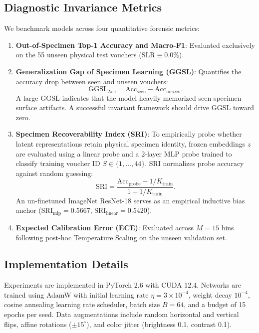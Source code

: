 \documentclass[a4paper,fleqn]{cas-sc}
\begin{document}
\subsection{Diagnostic Invariance Metrics}
We benchmark models across four quantitative forensic metrics:
\begin{enumerate}
    \item \textbf{Out-of-Specimen Top-1 Accuracy and Macro-F1}: Evaluated exclusively on the 55 unseen physical test vouchers ($\mathrm{SLR} \equiv 0.0\%$).
    
    \item \textbf{Generalization Gap of Specimen Learning (GGSL)}: Quantifies the accuracy drop between seen and unseen vouchers:
    \begin{equation}
        \text{GGSL}_{\text{Acc}} = \text{Acc}_{\text{seen}} - \text{Acc}_{\text{unseen}}.
    \end{equation}
    A large GGSL indicates that the model heavily memorized seen specimen surface artifacts. A successful invariant framework should drive GGSL toward zero.
    
    \item \textbf{Specimen Recoverability Index (SRI)}: To empirically probe whether latent representations retain physical specimen identity, frozen embeddings $z$ are evaluated using a linear probe and a 2-layer MLP probe trained to classify training voucher ID $S \in \{1,\dots,44\}$. SRI normalizes probe accuracy against random guessing:
    \begin{equation}
        \text{SRI} = \frac{\text{Acc}_{\text{probe}} - 1/K_{\text{train}}}{1 - 1/K_{\text{train}}}.
    \end{equation}
    An un-finetuned ImageNet ResNet-18 serves as an empirical inductive bias anchor ($\mathrm{SRI}_{\text{mlp}} = 0.5667$, $\mathrm{SRI}_{\text{linear}} = 0.5420$).
    
    \item \textbf{Expected Calibration Error (ECE)}: Evaluated across $M=15$ bins following post-hoc Temperature Scaling on the unseen validation set.
\end{enumerate}

\subsection{Implementation Details}
Experiments are implemented in PyTorch 2.6 with CUDA 12.4. Networks are trained using AdamW with initial learning rate $\eta = 3 \times 10^{-4}$, weight decay $10^{-4}$, cosine annealing learning rate scheduler, batch size $B=64$, and a budget of 15 epochs per seed. Data augmentations include random horizontal and vertical flips, affine rotations ($\pm 15^\circ$), and color jitter (brightness 0.1, contrast 0.1).
\end{document}
